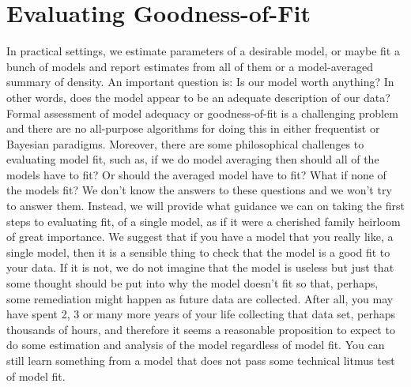 {\begin{comment}
\end{comment}




\section{Evaluating Goodness-of-Fit}

In practical settings, we estimate parameters of a desirable model, or
maybe fit a bunch of models and report estimates from all of them or a
model-averaged summary of density.  An important question is: Is our
model worth anything?  In other words, does the model appear to be an
adequate description of our data?
Formal assessment of model adequacy or goodness-of-fit is a
challenging problem and there are no all-purpose algorithms for doing
this in either frequentist or Bayesian paradigms. Moreover, there are
some philosophical challenges to evaluating model fit, such as, if we
do model averaging then should all of the models have to fit? Or
should the averaged model have to fit? What if none of the models fit?
We don't know the answers to these questions and we won't try to
answer them. Instead, we will provide what guidance we can on taking
the first steps to evaluating fit, of a single model, as if it were a
cherished family heirloom of great importance.  We suggest that if you
have a model that you really like, a single model, then it is a
sensible thing to check that the model is a good fit to your data. If
it is not, we do not imagine that the model is useless but just that
some thought should be put into why the model doesn't fit so that,
perhaps, some remediation might happen as future data are
collected. After all, you may have spent 2, 3 or many more years of
your life collecting that data set, perhaps thousands of hours, and
therefore it seems a reasonable proposition to expect to do some
estimation and analysis of the model regardless of model fit. You can
still learn something from a model that does not pass some technical
litmus test of model fit.

}
